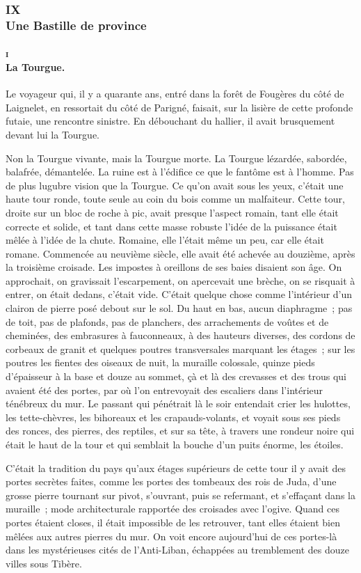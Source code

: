 \documentclass[french,twoside]{book} %
\begin{document}
 \subsubsection[{IX. Une Bastille de province}]{IX \\
Une Bastille de province}
\label{p3l2c9}
\paragraph[{i La Tourgue.}]{\textsc{i} \\
La Tourgue.}
\label{p3l2c9p1}
\noindent Le voyageur qui, il y a quarante ans, entré dans la forêt de Fougères du côté de Laignelet, en ressortait du côté de Parigné, faisait, sur la lisière de cette profonde futaie, une rencontre sinistre. En débouchant du hallier, il avait brusquement devant lui la Tourgue.\par
Non la Tourgue vivante, mais la Tourgue morte. La Tourgue lézardée, sabordée, balafrée, démantelée. La ruine est à l’édifice ce que le fantôme est à l’homme. Pas de plus lugubre vision que la Tourgue. Ce qu’on avait sous les yeux, c’était une haute tour ronde, toute seule au coin du bois comme un malfaiteur. Cette tour, droite sur un bloc de roche à pic, avait presque l’aspect romain, tant elle était correcte et solide, et tant dans cette masse robuste l’idée de la puissance était mêlée à l’idée de la chute. Romaine, elle l’était même un peu, car elle était romane. Commencée au neuvième siècle,  elle avait été achevée au douzième, après la troisième croisade. Les impostes à oreillons de ses baies disaient son âge. On approchait, on gravissait l’escarpement, on apercevait une brèche, on se risquait à entrer, on était dedans, c’était vide. C’était quelque chose comme l’intérieur d’un clairon de pierre posé debout sur le sol. Du haut en bas, aucun diaphragme ; pas de toit, pas de plafonds, pas de planchers, des arrachements de voûtes et de cheminées, des embrasures à fauconneaux, à des hauteurs diverses, des cordons de corbeaux de granit et quelques poutres transversales marquant les étages ; sur les poutres les fientes des oiseaux de nuit, la muraille colossale, quinze pieds d’épaisseur à la base et douze au sommet, çà et là des crevasses et des trous qui avaient été des portes, par où l’on entrevoyait des escaliers dans l’intérieur ténébreux du mur. Le passant qui pénétrait là le soir entendait crier les hulottes, les tette-chèvres, les bihoreaux et les crapauds-volants, et voyait sous ses pieds des ronces, des pierres, des reptiles, et sur sa tête, à travers une rondeur noire qui était le haut de la tour et qui semblait la bouche d’un puits énorme, les étoiles.\par
C’était la tradition du pays qu’aux étages supérieurs de cette tour il y avait des portes secrètes faites, comme les portes des tombeaux des rois de Juda, d’une grosse pierre tournant sur pivot, s’ouvrant, puis se refermant, et s’effaçant dans la muraille ; mode architecturale rapportée des croisades avec l’ogive. Quand ces portes étaient closes, il était impossible de les retrouver, tant elles étaient bien mêlées aux autres  pierres du mur. On voit encore aujourd’hui de ces portes-là dans les mystérieuses cités de l’Anti-Liban, échappées au tremblement des douze villes sous Tibère.
\end{document}
